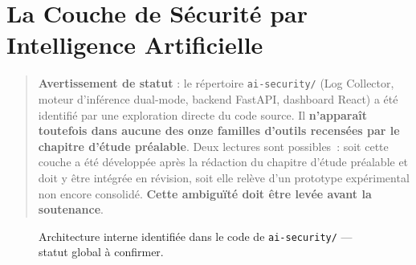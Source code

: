 
\section{La Couche de Sécurité par Intelligence Artificielle}
\label{sec:ia_layer}

\begin{quote}
\textbf{Avertissement de statut} : le répertoire \texttt{ai-security/} (Log Collector, moteur d'inférence dual-mode, backend FastAPI, dashboard React) a été identifié par une exploration directe du code source. Il \textbf{n'apparaît toutefois dans aucune des onze familles d'outils recensées par le chapitre d'étude préalable}. Deux lectures sont possibles~: soit cette couche a été développée après la rédaction du chapitre d'étude préalable et doit y être intégrée en révision, soit elle relève d'un prototype expérimental non encore consolidé. \textbf{Cette ambiguïté doit être levée avant la soutenance}. %
\end{quote}

\begin{figure}[htbp]
\centering
\scriptsize
{}
\caption{Architecture interne identifiée dans le code de \texttt{ai-security/} — statut global à confirmer.}
\label{fig:ia_interne}
\end{figure}

